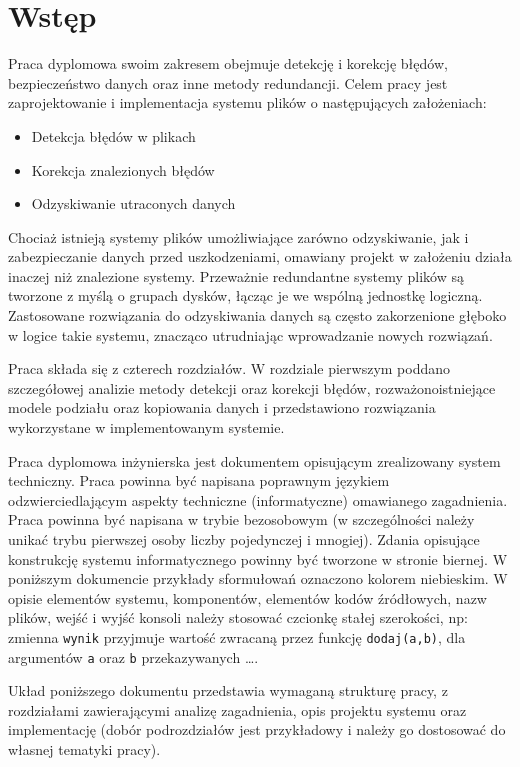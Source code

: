 \chapter{Wstęp}
\thispagestyle{chapterBeginStyle}

Praca dyplomowa swoim zakresem obejmuje detekcję i korekcję błędów, bezpieczeństwo danych oraz inne metody redundancji. Celem pracy jest zaprojektowanie i implementacja systemu plików o następujących założeniach:
\begin{itemize}
    \item Detekcja błędów w plikach
    \item Korekcja znalezionych błędów
    \item Odzyskiwanie utraconych danych 
\end{itemize}

Chociaż istnieją systemy plików umożliwiające zarówno odzyskiwanie, jak i zabezpieczanie danych przed uszkodzeniami\cite{Java}, omawiany projekt w założeniu działa inaczej niż znalezione systemy. Przeważnie redundantne systemy plików są tworzone z myślą o grupach dysków, łącząc je we wspólną jednostkę logiczną. Zastosowane rozwiązania do odzyskiwania danych są często zakorzenione głęboko w logice takie systemu, znacząco utrudniając wprowadzanie nowych rozwiązań.

Praca składa się z czterech rozdziałów. W rozdziale pierwszym poddano szczegółowej analizie metody detekcji oraz korekcji błędów, rozważonoistniejące modele podziału oraz kopiowania danych i przedstawiono rozwiązania wykorzystane w implementowanym systemie.


Praca dyplomowa inżynierska jest dokumentem opisującym zrealizowany system techniczny. Praca powinna być napisana poprawnym językiem odzwierciedlającym aspekty techniczne (informatyczne) omawianego zagadnienia. Praca powinna być napisana w trybie bezosobowym (w szczególności należy unikać trybu pierwszej osoby liczby pojedynczej i mnogiej). Zdania opisujące konstrukcję systemu informatycznego powinny być tworzone w stronie biernej. W poniższym dokumencie przykłady sformułowań oznaczono kolorem niebieskim. W opisie elementów systemu, komponentów, elementów kodów źródłowych, nazw plików, wejść i wyjść konsoli należy stosować czcionkę stałej szerokości, np: {\color{lgray}zmienna \verb|wynik| przyjmuje wartość zwracaną przez funkcję \verb|dodaj(a,b)|, dla argumentów \verb|a| oraz \verb|b| przekazywanych \ldots}.

Układ poniższego dokumentu przedstawia wymaganą strukturę pracy, z rozdziałami zawierającymi analizę zagadnienia, opis projektu systemu oraz implementację (dobór podrozdziałów jest przykładowy i należy go dostosować do własnej tematyki pracy). 
  
